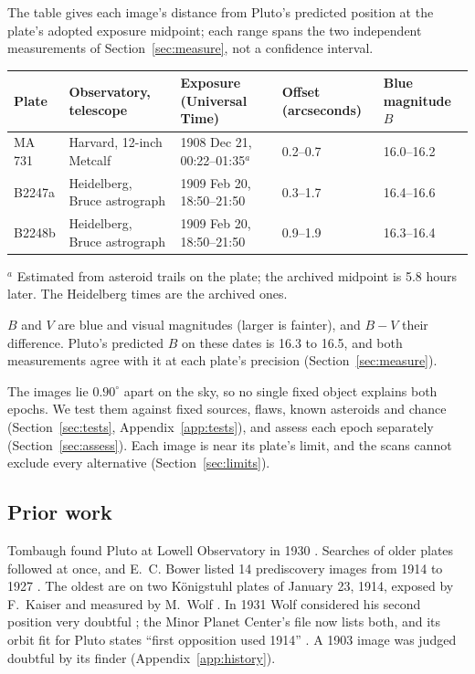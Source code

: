 \documentclass[11pt]{article}
\begin{document}
The table gives each image's distance from Pluto's predicted position at the plate's adopted exposure midpoint; each range spans the two independent measurements of Section~\ref{sec:measure}, not a confidence interval.

\begin{center}
\begin{minipage}{\textwidth}
\centering
\small
\setlength{\tabcolsep}{2.5pt}
\begin{tabular}{@{}lllll@{}}
\toprule
Plate & Observatory, telescope & Exposure (Universal Time) & Offset (arcseconds) & Blue magnitude $B$ \\
\midrule
MA 731 & Harvard, 12-inch Metcalf & 1908 Dec 21, 00:22--01:35$^{a}$ & 0.2--0.7 & 16.0--16.2 \\
B2247a & Heidelberg, Bruce astrograph & 1909 Feb 20, 18:50--21:50 & 0.3--1.7 & 16.4--16.6 \\
B2248b & Heidelberg, Bruce astrograph & 1909 Feb 20, 18:50--21:50 & 0.9--1.9 & 16.3--16.4 \\
\bottomrule
\end{tabular}

\smallskip
\raggedright\small $^{a}$ Estimated from asteroid trails on the plate; the archived midpoint is 5.8 hours later. The Heidelberg times are the archived ones.
\end{minipage}
\end{center}

\medskip
$B$ and $V$ are blue and visual magnitudes (larger is fainter), and $B-V$ their difference. Pluto's predicted $B$ on these dates is 16.3 to 16.5, and both measurements agree with it at each plate's precision (Section~\ref{sec:measure}).

The images lie $0.90^\circ$ apart on the sky, so no single fixed object explains both epochs. We test them against fixed sources, flaws, known asteroids and chance (Section~\ref{sec:tests}, Appendix~\ref{app:tests}), and assess each epoch separately (Section~\ref{sec:assess}). Each image is near its plate's limit, and the scans cannot exclude every alternative (Section~\ref{sec:limits}).

\subsection{Prior work}
Tombaugh found Pluto at Lowell Observatory in 1930 \cite{Tombaugh1946}. Searches of older plates followed at once, and E.~C. Bower listed 14 prediscovery images from 1914 to 1927 \cite{Bower1931,Schaefer2008}. The oldest are on two Königstuhl plates of January 23, 1914, exposed by F.~Kaiser and measured by M.~Wolf \cite{Bower1931,HDAP}. In 1931 Wolf considered his second position very doubtful \cite{HAC157}; the Minor Planet Center's file now lists both, and its orbit fit for Pluto states ``first opposition used 1914'' \cite{MPC}. A 1903 image was judged doubtful by its finder (Appendix~\ref{app:history}).
\end{document}
